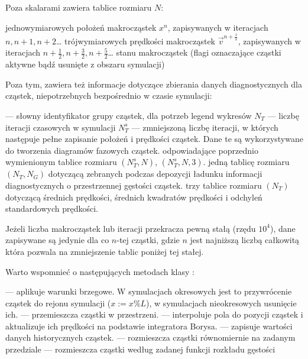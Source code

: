 Poza skalarami zawiera tablice rozmiaru $N$:
\begin{itemize}
    \itemi{} jednowymiarowych położeń makrocząstek $x^n$, zapisywanych w
        iteracjach $n, n+1, n+2$\ldots
    \itemi{} trójwymiarowych prędkości makrocząstek $\vec{v}^{n+\frac{1}{2}}$,
        zapisywanych w iteracjach $n+\frac{1}{2}, n+\frac{3}{2}, n+\frac{5}{2}$\ldots
    \itemi{} stanu makrocząstek (flagi oznaczające cząstki aktywne
        bądź usunięte z obszaru symulacji)
\end{itemize}

Poza tym, zawiera też informacje dotyczące zbierania danych diagnostycznych
dla cząstek, niepotrzebnych bezpośrednio w czasie symulacji:
\begin{itemize}
    \itemi{}  --- słowny identyfikator grupy cząstek, dla potrzeb legend wykresów
    \itemi{} $N_T$ --- liczbę iteracji czasowych w symulacji
    \itemi{} $N_T^s$ --- zmniejszoną liczbę iteracji, w których następuje pełne
        zapisanie położeń i prędkości cząstek.  Dane te są wykorzystywane
        do tworzenia diagramów fazowych cząstek.
    \itemi{} odpowiadające poprzednio wymienionym tablice rozmiaru $(N_T^s,
        N)$, $(N_T^s, N, 3)$. 
    \itemi{} jedną tablicę rozmiaru $(N_T, N_G)$ dotyczącą zebranych podczas
        depozycji ładunku informacji diagnostycznych o przestrzennej gęstości cząstek.
    \itemi{} trzy tablice rozmiaru $(N_T)$ dotyczącą średnich prędkości,
        średnich kwadratów prędkości i odchyleń standardowych prędkości.
\end{itemize}

Jeżeli liczba makrocząstek lub iteracji przekracza pewną stałą (rzędu $10^4$), dane zapisywane są jedynie dla co $n$-tej cząstki,
gdzie $n$ jest najniższą liczbą całkowitą która pozwala na zmniejszenie tablic poniżej tej stałej.

Warto wspomnieć o następujących metodach klasy :
\begin{itemize}
    \itemi{}  --- aplikuje warunki brzegowe. W symulacjach okresowych jest to przywrócenie cząstek do rejonu symulacji ($x := x \% L$), w symulacjach nieokresowych usunięcie ich.
    \itemi{}   --- przemieszcza cząstki w przestrzeni.
    \itemi{}  --- interpoluje pola do pozycji cząstek i aktualizuje ich prędkości na podstawie integratora Borysa.
    \itemi{}  --- zapisuje wartości danych historycznych cząstek.
    \itemi{}  --- rozmieszcza cząstki równomiernie na zadanym przedziale
    \itemi{}  --- rozmieszcza cząstki według zadanej funkcji rozkładu gęstości
\end{itemize}

